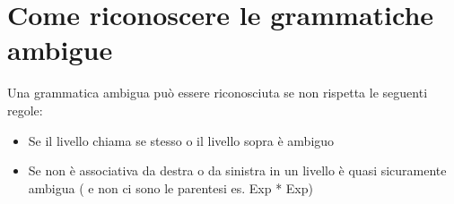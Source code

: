 \documentclass[10pt]{article}
\begin{document}
\newpage 
\section{ Come riconoscere le grammatiche ambigue}

Una grammatica ambigua può essere riconosciuta se non rispetta le seguenti regole:

\begin{itemize}
    \item Se il livello chiama se stesso o il livello sopra è ambiguo
    \item Se non è associativa da destra o da sinistra in un livello è quasi sicuramente ambigua ( e non ci sono le parentesi es. Exp * Exp)
\end{itemize}
\end{document}
